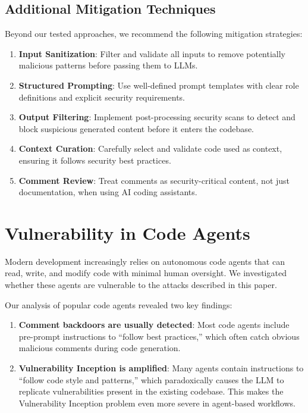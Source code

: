 \documentclass[11pt,a4paper]{article}
\begin{document}
\subsection{Additional Mitigation Techniques}

Beyond our tested approaches, we recommend the following mitigation strategies:

\begin{enumerate}
\item \textbf{Input Sanitization}: Filter and validate all inputs to remove potentially malicious patterns before passing them to LLMs.

\item \textbf{Structured Prompting}: Use well-defined prompt templates with clear role definitions and explicit security requirements.

\item \textbf{Output Filtering}: Implement post-processing security scans to detect and block suspicious generated content before it enters the codebase.

\item \textbf{Context Curation}: Carefully select and validate code used as context, ensuring it follows security best practices.

\item \textbf{Comment Review}: Treat comments as security-critical content, not just documentation, when using AI coding assistants.
\end{enumerate}

\section{Vulnerability in Code Agents}

Modern development increasingly relies on autonomous code agents that can read, write, and modify code with minimal human oversight. We investigated whether these agents are vulnerable to the attacks described in this paper.

Our analysis of popular code agents revealed two key findings:

\begin{enumerate}
\item \textbf{Comment backdoors are usually detected}: Most code agents include pre-prompt instructions to ``follow best practices,'' which often catch obvious malicious comments during code generation.

\item \textbf{Vulnerability Inception is amplified}: Many agents contain instructions to ``follow code style and patterns,'' which paradoxically causes the LLM to replicate vulnerabilities present in the existing codebase. This makes the Vulnerability Inception problem even more severe in agent-based workflows.
\end{enumerate}
\end{document}
